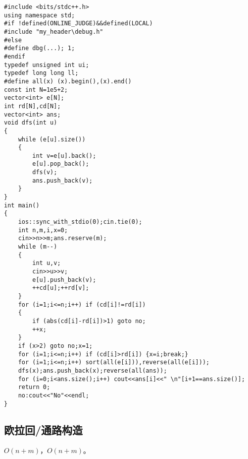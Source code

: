 \documentclass[12pt]{ctexart}
\begin{document}
\begin{lstlisting}
#include <bits/stdc++.h>
using namespace std;
#if !defined(ONLINE_JUDGE)&&defined(LOCAL)
#include "my_header\debug.h"
#else
#define dbg(...); 1;
#endif
typedef unsigned int ui;
typedef long long ll;
#define all(x) (x).begin(),(x).end()
const int N=1e5+2;
vector<int> e[N];
int rd[N],cd[N];
vector<int> ans;
void dfs(int u)
{
	while (e[u].size())
	{
		int v=e[u].back();
		e[u].pop_back();
		dfs(v);
		ans.push_back(v);
	}
}
int main()
{
	ios::sync_with_stdio(0);cin.tie(0);
	int n,m,i,x=0;
	cin>>n>>m;ans.reserve(m);
	while (m--)
	{
		int u,v;
		cin>>u>>v;
		e[u].push_back(v);
		++cd[u];++rd[v];
	}
	for (i=1;i<=n;i++) if (cd[i]!=rd[i])
	{
		if (abs(cd[i]-rd[i])>1) goto no;
		++x;
	}
	if (x>2) goto no;x=1;
	for (i=1;i<=n;i++) if (cd[i]>rd[i]) {x=i;break;}
	for (i=1;i<=n;i++) sort(all(e[i])),reverse(all(e[i]));
	dfs(x);ans.push_back(x);reverse(all(ans));
	for (i=0;i<ans.size();i++) cout<<ans[i]<<" \n"[i+1==ans.size()];
	return 0;
	no:cout<<"No"<<endl;
}
\end{lstlisting}

\subsection{欧拉回/通路构造}

$O(n+m)$，$O(n+m)$。
\end{document}

